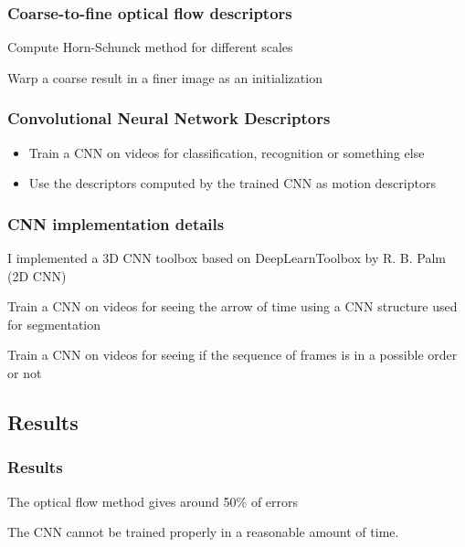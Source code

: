 \documentclass[french]{beamer}
\begin{document}
	\begin{frame}
		\frametitle{Coarse-to-fine optical flow descriptors}
		
			Compute Horn-Schunck method for different scales
			\newline
			
			Warp a coarse result in a finer image as an initialization
		
	\end{frame}
	
	
	\begin{frame}
		\frametitle{Convolutional Neural Network Descriptors}
		
		\begin{itemize}
			\item Train a CNN on videos for classification, recognition or something else
		\item Use the descriptors computed by the trained CNN as motion descriptors
		\end{itemize}
	\end{frame}
	
	\begin{frame}
		\frametitle{CNN implementation details}
		
		I implemented a 3D CNN toolbox based on DeepLearnToolbox by R. B. Palm (2D CNN)
		\newline
		
		Train a CNN on videos for seeing the arrow of time using a CNN structure used for segmentation
		\newline
		
		Train a CNN on videos for seeing if the sequence of frames is in a possible order or not
		
	\end{frame}
	
	\begin{frame}
		\section{Results}
		\frametitle{Results}
		
			The optical flow method gives around 50\% of errors
			\newline
			
			The CNN cannot be trained properly in a reasonable amount of time.
		
	\end{frame}
	
\end{document}
